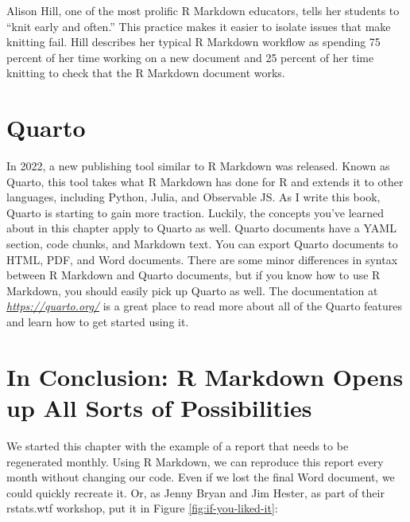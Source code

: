 \documentclass[
]{book}
\begin{document}
Alison Hill, one of the most prolific R Markdown educators, tells her students to ``knit early and often.'' This practice makes it easier to isolate issues that make knitting fail. Hill describes her typical R Markdown workflow as spending 75 percent of her time working on a new document and 25 percent of her time knitting to check that the R Markdown document works.

\hypertarget{quarto}{%
\section*{Quarto}\label{quarto}}

In 2022, a new publishing tool similar to R Markdown was released. Known as Quarto, this tool takes what R Markdown has done for R and extends it to other languages, including Python, Julia, and Observable JS. As I write this book, Quarto is starting to gain more traction. Luckily, the concepts you've learned about in this chapter apply to Quarto as well. Quarto documents have a YAML section, code chunks, and Markdown text. You can export Quarto documents to HTML, PDF, and Word documents. There are some minor differences in syntax between R Markdown and Quarto documents, but if you know how to use R Markdown, you should easily pick up Quarto as well. The documentation at \emph{\url{https://quarto.org/}} is a great place to read more about all of the Quarto features and learn how to get started using it.

\hypertarget{in-conclusion-r-markdown-opens-up-all-sorts-of-possibilities}{%
\section*{In Conclusion: R Markdown Opens up All Sorts of Possibilities}\label{in-conclusion-r-markdown-opens-up-all-sorts-of-possibilities}}

We started this chapter with the example of a report that needs to be regenerated monthly. Using R Markdown, we can reproduce this report every month without changing our code. Even if we lost the final Word document, we could quickly recreate it. Or, as Jenny Bryan and Jim Hester, as part of their rstats.wtf workshop, put it in Figure \ref{fig:if-you-liked-it}:
\end{document}
